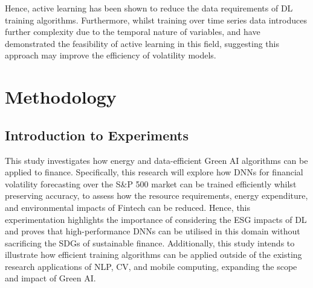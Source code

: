 \documentclass[a4paper, 11pt]{report}
\begin{document}
    Hence, active learning has been shown to reduce the data requirements of DL training algorithms. Furthermore, whilst training over time series data introduces further complexity due to the temporal nature of variables, \citet{peng-2017} and \citet{zimmer-2018} have demonstrated the feasibility of active learning in this field, suggesting this approach may improve the efficiency of volatility models.


    \newpage
    \chapter{Methodology}
    \label{chapter: experiments}

    \section{Introduction to Experiments}

    This study investigates how energy and data-efficient Green AI algorithms can be applied to finance. Specifically, this research will explore how DNNs for financial volatility forecasting over the S\&P 500 market can be trained efficiently whilst preserving accuracy, to assess how the resource requirements, energy expenditure, and environmental impacts of Fintech can be reduced. Hence, this experimentation highlights the importance of considering the ESG impacts of DL and proves that high-performance DNNs can be utilised in this domain without sacrificing the SDGs of sustainable finance. Additionally, this study intends to illustrate how efficient training algorithms can be applied outside of the existing research applications of NLP, CV, and mobile computing, expanding the scope and impact of Green AI.
\end{document}
